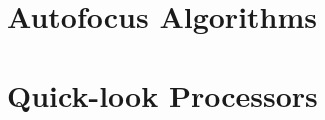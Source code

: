 \documentclass[class=report,11pt,crop=false]{standalone}
\begin{document}


\section{Autofocus Algorithms}
\section{Quick-look Processors}



\ifstandalone

\printnoidxglossary[type=\acronymtype,nonumberlist]
\fi
\end{document}
